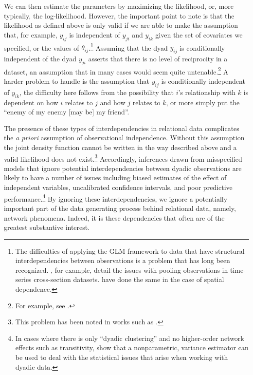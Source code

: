 \documentclass[12pt,pdflatex]{elsarticle}
\begin{document}
We can then estimate the parameters by maximizing the likelihood, or, more typically, the log-likelihood. However, the important point to note is that the likelihood as defined above is only valid if we are able to make the assumption that, for example, $y_{ij}$ is independent of $y_{ji}$ and $y_{ik}$ given the set of covariates we specified, or the values of $\theta_{ij}$.\footnote{The difficulties of applying the GLM framework to data that have structural interdependencies between observations is a problem that has long been recognized. \citet{beck:katz:1995}, for example, detail the issues with pooling observations in time-series cross-section datasets. \citet{ward:gleditsch:2008} have done the same in the case of spatial dependence.} Assuming that the dyad $y_{ij}$ is conditionally independent of the dyad $y_{ji}$ asserts that there is no level of reciprocity in a dataset, an assumption that in many cases would seem quite untenable.\footnote{For example, see \citet{ward:etal:2007,cranmer:2014,dorff:minhas:2016}.} A harder problem to handle is the assumption that $y_{ij}$ is conditionally independent of $y_{ik}$, the difficulty here follows from the possibility that $i$'s relationship with $k$ is dependent on how $i$ relates to $j$ and how $j$ relates to $k$, or more simply put the ``enemy of my enemy [may be] my friend''. 

The presence of these types of interdependencies in relational data complicates the \textit{a priori} assumption of observational independence. Without this assumption the joint density function cannot be written in the way described above and  a valid likelihood does not exist.\footnote{This problem has been noted in works such as \citet{lai:1995,manger:etal:2012,kinne:2013}.} Accordingly, inferences drawn from misspecified models that ignore potential interdependencies between dyadic observations are likely to have a number of issues including biased estimates of the effect of independent variables, uncalibrated confidence intervals, and poor predictive performance.\footnote{In cases where there is only ``dyadic clustering'' and no higher-order network effects such as transitivity, \citet{aronow:etal:2015} show that a nonparametric, variance estimator can be used to deal with the statistical issues that arise when working with dyadic data.} By ignoring these interdependencies, we ignore a potentially important part of the data generating process behind relational data, namely, network phenomena. Indeed, it is these dependencies that often are of the greatest substantive interest. 
\end{document}
